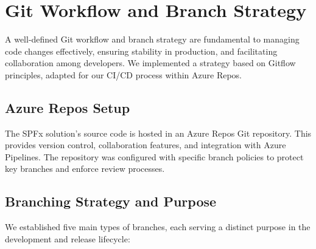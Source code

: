 \chapter{Git Workflow and Branch Strategy}
\label{chapter:GitWorkflow}

A well-defined Git workflow and branch strategy are fundamental to managing code changes effectively, ensuring stability in production, and facilitating collaboration among developers. We implemented a strategy based on Gitflow principles, adapted for our CI/CD process within Azure Repos.

\section{Azure Repos Setup}
\label{sec:AzureReposSetup}

The SPFx solution's source code is hosted in an Azure Repos Git repository. This provides version control, collaboration features, and integration with Azure Pipelines. The repository was configured with specific branch policies to protect key branches and enforce review processes.

\section{Branching Strategy and Purpose}
\label{sec:BranchingStrategy}

We established five main types of branches, each serving a distinct purpose in the development and release lifecycle:


